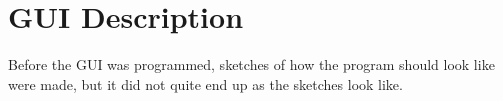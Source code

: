 \section{GUI Description}

Before the GUI was programmed, sketches of how the program should look like were made, but it did not quite end up as the sketches look like. 